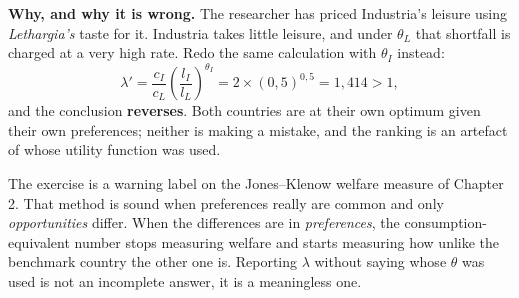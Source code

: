 \documentclass[12pt, letterpaper]{article}
\begin{document}
\begin{tcolorbox}[oddbox,title={Problem 9.5 \quad Differences in Preferences}]
\begin{enumerate}
\smallskip
\textbf{Why, and why it is wrong.} The researcher has priced Industria's leisure using
\emph{Lethargia's} taste for it. Industria takes little leisure, and under $\theta_L$ that
shortfall is charged at a very high rate. Redo the same calculation with $\theta_I$ instead:
\[
\lambda'=\frac{c_I}{c_L}\left(\frac{l_I}{l_L}\right)^{\theta_I}
=2\times(0{,}5)^{0{,}5}=1{,}414>1,
\]
and the conclusion \textbf{reverses}. Both countries are at their own optimum given their
own preferences; neither is making a mistake, and the ranking is an artefact of whose
utility function was used.
\end{enumerate}

\begin{tcolorbox}[trapbox]
The exercise is a warning label on the Jones--Klenow welfare measure of Chapter 2. That
method is sound when preferences really are common and only \emph{opportunities} differ.
When the differences are in \emph{preferences}, the consumption-equivalent number stops
measuring welfare and starts measuring how unlike the benchmark country the other one is.
Reporting $\lambda$ without saying whose $\theta$ was used is not an incomplete answer, it
is a meaningless one.
\end{tcolorbox}
\end{tcolorbox}
\end{document}
